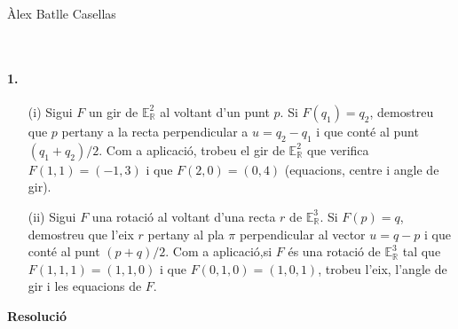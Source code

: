 \documentclass[10pt]{article}
\author{Àlex Batlle Casellas}
\newcommand{\euc}[1]{\mathbb{E}_{\mathbb{R}}^{#1}}
\begin{document}
\begin{small}
Àlex Batlle Casellas
\end{small}\\
\paragraph{1.}
\begin{itemize}
	\item[(i)] Sigui $F$ un gir de $\euc{2}$ al voltant d'un punt $p$. Si $F(q_1)=q_2$, demostreu que $p$ pertany a la recta perpendicular a $u=q_2-q_1$ i que conté al punt $(q_1+q_2)/2$. Com a aplicació, trobeu el gir de $\euc{2}$ que verifica $F(1,1)=(-1,3)$ i que $F(2,0)=(0,4)$ (equacions, centre i angle de gir).
	\item[(ii)] Sigui $F$ una rotació al voltant d'una recta $r$ de $\euc{3}$. Si $F(p)=q$, demostreu que l'eix $r$ pertany al pla $\pi$ perpendicular al vector $u=q-p$ i que conté al punt $(p+q)/2$. Com a aplicació,si $F$ és una rotació de $\euc{3}$ tal que $F(1,1,1)=(1,1,0)$ i que $F(0,1,0)=(1,0,1)$, trobeu l'eix, l'angle de gir i les equacions de $F$. 
\end{itemize}
\textbf{Resolució}\\
\end{document}
